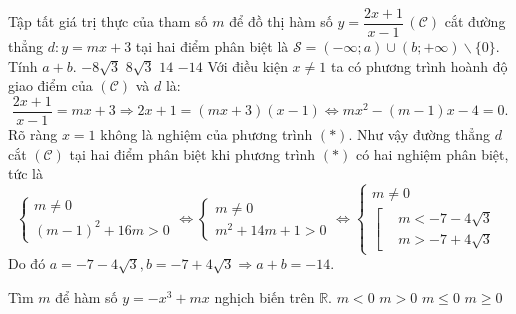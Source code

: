 \begin{ex}%
Tập tất giá trị thực của tham số $m$ để đồ thị hàm số $y=\dfrac{2x+1}{x-1}\,\mathscr{(C)}$ cắt đường thẳng $d\colon y=mx+3$  tại hai điểm phân biệt là  $\mathscr{S} =\left (-\infty;a\right ) \cup \left (b;+\infty\right ) \backslash \{0\}$. Tính $ a+b.$
	\choice 
	{$-8\sqrt{3}$}
	{$8\sqrt{3}$}
	{$14$}
	{\True $-14$}
	\loigiai
	{
		Với điều kiện $x \neq 1$ ta có phương trình hoành độ giao điểm của $\mathscr{(C)}$ và $d$ là:
		\begin{equation*}
		\dfrac{2x+1}{x-1} = mx+3 \Rightarrow 2x+1 = (mx+3)(x-1) \Leftrightarrow mx^2 - (m-1)x - 4 = 0. \tag{$*$}
		\end{equation*}
		Rõ ràng $x=1$ không là nghiệm của phương trình $(*)$. Như vậy đường thẳng $d$ cắt $\mathscr{(C)}$ tại hai điểm phân biệt khi phương trình $(*)$ có hai nghiệm phân biệt, tức là
		\begin{equation*}
		\begin{cases} m \neq 0 \\ (m-1)^2 + 16m > 0 \end{cases} \Leftrightarrow \begin{cases} m \neq 0 \\ m^2 + 14m + 1 > 0 \end{cases} \Leftrightarrow \begin{cases} m \neq 0 \\ \left[\begin{aligned} & m<-7-4\sqrt{3} \\& m>-7+4\sqrt{3}\end{aligned}\right. \end{cases} 
		\end{equation*}
	Do đó $ a=-7-4\sqrt{3},b=-7+4\sqrt{3} \Rightarrow a+b =-14.$
	}
\end{ex}
\begin{ex}%
	Tìm $m$ để hàm số $y=-x^3+mx$ nghịch biến trên $\mathbb{R}$.
	\choice
	{$m<0$}
	{$m>0$}
	{\True $m\le 0$}
	{$m\ge 0$}
\end{ex}

